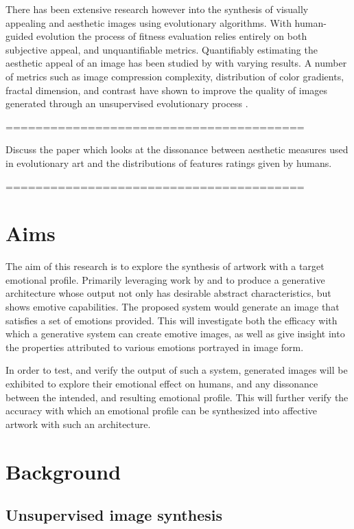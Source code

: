 \documentclass{article}
\begin{document}
There has been extensive research however into the synthesis of visually appealing and aesthetic images using evolutionary algorithms.
With human-guided evolution \citep{nevar} the process of fitness evaluation relies entirely on both subjective appeal, and unquantifiable metrics.
Quantifiably estimating the aesthetic appeal of an image has been studied by \citet{den2010comparing, den2010using, den2011evolving} with varying results.
A number of metrics such as image compression complexity, distribution of color gradients, fractal dimension, and contrast have shown to improve the quality of images generated through an unsupervised evolutionary process \citep{den2014investigating}.

========================================

Discuss the paper \citet{johnson2019understanding} which looks at the dissonance between aesthetic measures used in evolutionary art and the distributions of features ratings given by humans.

========================================

\section{Aims}

The aim of this research is to explore the synthesis of artwork with a target emotional profile.
Primarily leveraging work by \citet{tan2017artgan} and \citet{kim2018building} to produce a generative architecture whose output not only has desirable abstract characteristics, but shows emotive capabilities.
The proposed system would generate an image that satisfies a set of emotions provided.
This will investigate both the efficacy with which a generative system can create emotive images, as well as give insight into the properties attributed to various emotions portrayed in image form.

In order to test, and verify the output of such a system, generated images will be exhibited to explore their emotional effect on humans, and any dissonance between the intended, and resulting emotional profile.
This will further verify the accuracy with which an emotional profile can be synthesized into affective artwork with such an architecture.

\section{Background}

\subsection{Unsupervised image synthesis}
\end{document}
